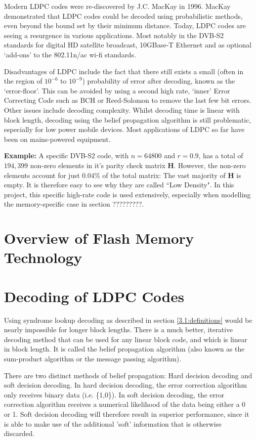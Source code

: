 \documentclass[11pt]{article}
\numberwithin{equation}{subsection}
\begin{document}
Modern LDPC codes were re-discovered by J.C. MacKay in 1996. MacKay demonstrated that LDPC codes could be decoded using probabilistic methods, even beyond the bound set by their minimum distance. Today, LDPC codes are seeing a resurgence in various applications. Most notably in the DVB-S2 standards for digital HD satellite broadcast, 10GBase-T Ethernet and as optional `add-ons' to the 802.11n/ac wi-fi standards.

Disadvantages of LDPC include the fact that there still exists a small (often in the region of $10^{-6}$ to $10^{-9}$) probability of error after decoding, known as the `error-floor'. This can be avoided by using a second high rate, `inner' Error Correcting Code such as BCH or Reed-Solomon to remove the last few bit errors. Other issues include decoding complexity. Whilst decoding time is linear with block length, decoding using the belief propagation algorithm is still problematic, especially for low power mobile devices. Most applications of LDPC so far have been on mains-powered equipment.


\textbf{Example:}
A specific DVB-S2 code, with $n = 64800$ and $r = 0.9$, has a total of $194,399$ non-zero elements in it's parity check matrix $\mathbf{H}$. However, the non-zero elements account for just 0.04\% of the total matrix: The vast majority of $\mathbf{H}$ is empty. It is therefore easy to see why they are called ``Low Density". In this project, this specific high-rate code is used extensively, especially when modelling the memory-specific case in section ?????????.

\section{Overview of Flash Memory Technology} 

\section{Decoding of LDPC Codes}
Using syndrome lookup decoding as described in section \ref{3.1:definitions} would be nearly impossible for longer block lengths. There is a much better, iterative decoding method that can be used for any linear block code, and which is linear in block length. It is called the belief propagation algorithm (also known as the sum-product algorithm or the message passing algorithm). 

There are two distinct methods of belief propagation: Hard decision decoding and soft decision decoding. In hard decision decoding, the error correction algorithm only receives binary data (i.e. \{1,0\}). In soft decision decoding, the error correction algorithm receives a numerical likelihood of the data being either a 0 or 1. Soft decision decoding will therefore result in superior performance, since it is able to make use of the additional 'soft' information that is otherwise discarded.
\end{document}
